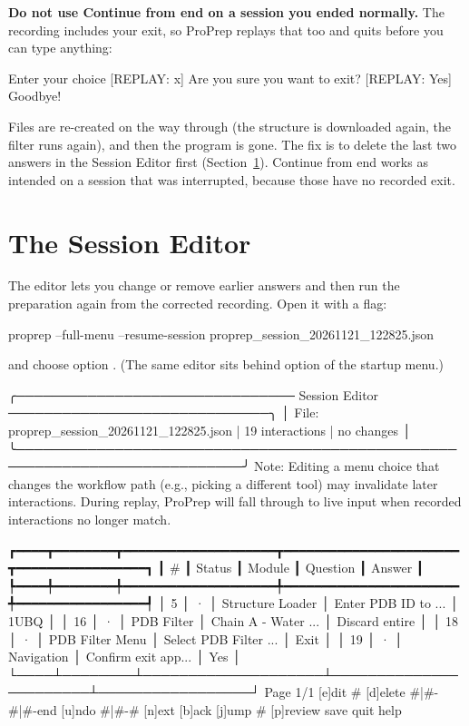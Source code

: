 \begin{watchout}
\textbf{Do not use \textsf{Continue from end} on a session you ended
normally.} The recording includes your exit, so ProPrep replays that too and
quits before you can type anything:
\begin{screen}
Enter your choice [REPLAY: x]
Are you sure you want to exit? [REPLAY: Yes]
Goodbye!
\end{screen}
Files are re-created on the way through (the structure is downloaded again,
the filter runs again), and then the program is gone. The fix is to delete the
last two answers in the Session Editor first
(Section~\ref{sec:sessions-editor}). \textsf{Continue from end} works as
intended on a session that was interrupted, because those have no recorded
exit.
\end{watchout}

\section{The Session Editor}
\label{sec:sessions-editor}

The editor lets you change or remove earlier answers and then run the
preparation again from the corrected recording. Open it with a flag:

\begin{terminal}
proprep --full-menu --resume-session proprep_session_20261121_122825.json
\end{terminal}

and choose option . (The same editor sits behind option  of the
startup menu.)

\begin{screen}
╭─────────────────────────────── Session Editor ─────────────────────────────╮
│ File: proprep_session_20261121_122825.json | 19 interactions | no changes │
╰───────────────────────────────────────────────────────────────────────────╯
Note: Editing a menu choice that changes the workflow path (e.g., picking
a different tool) may invalidate later interactions. During replay, ProPrep
will fall through to live input when recorded interactions no longer match.

┏━━━━┳━━━━━━━━┳━━━━━━━━━━━━━━━━━━━━┳━━━━━━━━━━━━━━━━━━━━━━━┳━━━━━━━━━━━━━━━━━┓
┃  # ┃ Status ┃ Module             ┃ Question              ┃ Answer          ┃
┡━━━━╇━━━━━━━━╇━━━━━━━━━━━━━━━━━━━━╇━━━━━━━━━━━━━━━━━━━━━━━╇━━━━━━━━━━━━━━━━━┩
│  5 │   ·    │ Structure Loader   │ Enter PDB ID to ...   │ 1UBQ            │
│ 16 │   ·    │ PDB Filter         │ Chain A - Water ...   │ Discard entire  │
│ 18 │   ·    │ PDB Filter Menu    │ Select PDB Filter ... │ Exit            │
│ 19 │   ·    │ Navigation         │ Confirm exit app...   │ Yes             │
└────┴────────┴────────────────────┴───────────────────────┴─────────────────┘
Page 1/1
[e]dit #  [d]elete #|#-#|#-end  [u]ndo #|#-#  [n]ext  [b]ack  [j]ump #
[p]review  save  quit  help
\end{screen}

